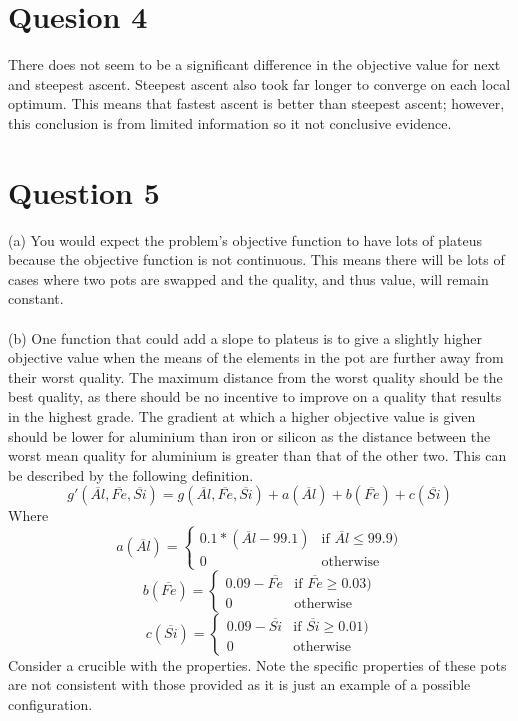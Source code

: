\documentclass{article}
\begin{document}
\section{Quesion 4}
There does not seem to be a significant difference in the objective
value for next and steepest ascent. Steepest ascent also took far
longer to converge on each local optimum. This means that fastest
ascent is better than steepest ascent; however, this conclusion is from
limited information so it not conclusive evidence.

\section{Question 5}
(a) You would expect the problem's objective function to have lots of 
plateus because the objective function is not continuous. This means
there will be lots of cases where two pots are swapped and the
quality, and thus value, will remain constant.\\\\

\noindent (b) One function that could add a slope to plateus is to 
give a slightly higher objective value when the means of the elements in the pot
are further away from their worst quality. The maximum distance from the
worst quality should be the best quality, as there should be no incentive
to improve on a quality that results in the highest grade. The gradient 
at which a higher objective value is given should be lower for
aluminium than iron or silicon as the distance between the worst mean
quality for aluminium is greater than that of the other two. This can 
be described by the following definition.
\[
  g'(\overline{Al},\overline{Fe},\overline{Si}) = 
  g(\overline{Al},\overline{Fe},\overline{Si}) + a(\overline{Al}) +
  b(\overline{Fe}) + c(\overline{Si})
\]
Where
\[
  a(\overline{Al}) = 
  \begin{cases}
    0.1*(\overline{Al} - 99.1) & \text{if } \overline{Al} \le 99.9)\\
    0 & \text{otherwise}
  \end{cases}
\]
\[
  b(\overline{Fe}) = 
  \begin{cases}
    0.09 - \overline{Fe} & \text{if } \overline{Fe} \ge 0.03)\\
    0 & \text{otherwise}
  \end{cases}
\]
\[
  c(\overline{Si}) = 
  \begin{cases}
    0.09 - \overline{Si} & \text{if } \overline{Si} \ge 0.01)\\
    0 & \text{otherwise}
  \end{cases}
\]
Consider a crucible with the properties. Note the specific properties
of these pots are not consistent with those provided as it is just an
example of a possible configuration.
\end{document}
